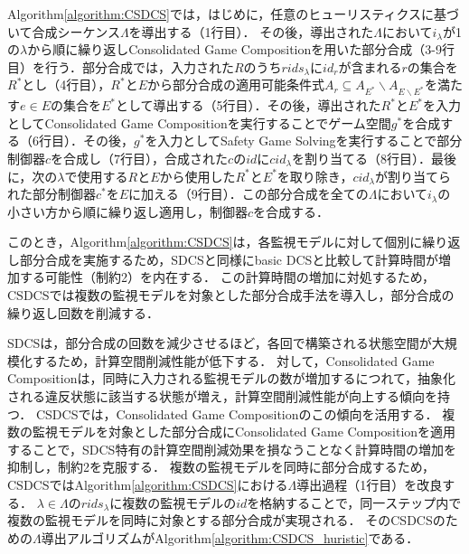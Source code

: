 Algorithm\ref{algorithm:CSDCS}では，はじめに，任意のヒューリスティクスに基づいて合成シーケンス$\Lambda$を導出する（1行目）．
その後，導出された$\Lambda$において$i_{\lambda}$が1の$\lambda$から順に繰り返しConsolidated Game Compositionを用いた部分合成（3-9行目）を行う．部分合成では，入力された$R$のうち$rids_{\lambda}$に$id_{r}$が含まれる$r$の集合を$R^*$とし（4行目），$R^*$と$E$から部分合成の適用可能条件式$A_{r} \subseteq A_{E^*} \backslash A_{E \backslash E^*}$を満たす$e \in E$の集合を$E^*$として導出する（5行目）．その後，導出された$R^*$と$E^*$を入力としてConsolidated Game Compositionを実行することでゲーム空間$g^*$を合成する（6行目）．その後，$g^*$を入力としてSafety Game Solvingを実行することで部分制御器$c$を合成し（7行目），合成された$c$の$id$に$cid_{\lambda}$を割り当てる（8行目）．最後に，次の$\lambda$で使用する$R$と$E$から使用した$R^*$と$E^*$を取り除き，$cid_{\lambda}$が割り当てられた部分制御器$c^*$を$E$に加える（9行目）．この部分合成を全ての$\Lambda$において$i_{\lambda}$の小さい方から順に繰り返し適用し，制御器$c$を合成する．

このとき，Algorithm\ref{algorithm:CSDCS}は，各監視モデルに対して個別に繰り返し部分合成を実施するため，SDCSと同様にbasic DCSと比較して計算時間が増加する可能性（制約2）を内在する．
この計算時間の増加に対処するため，CSDCSでは複数の監視モデルを対象とした部分合成手法を導入し，部分合成の繰り返し回数を削減する．

SDCSは，部分合成の回数を減少させるほど，各回で構築される状態空間が大規模化するため，計算空間削減性能が低下する．
対して，Consolidated Game Compositionは，同時に入力される監視モデルの数が増加するにつれて，抽象化される違反状態に該当する状態が増え，計算空間削減性能が向上する傾向を持つ．
CSDCSでは，Consolidated Game Compositionのこの傾向を活用する．
複数の監視モデルを対象とした部分合成にConsolidated Game Compositionを適用することで，SDCS特有の計算空間削減効果を損なうことなく計算時間の増加を抑制し，制約2を克服する．
複数の監視モデルを同時に部分合成するため，CSDCSではAlgorithm\ref{algorithm:CSDCS}における$\Lambda$導出過程（1行目）を改良する．
$\lambda \in \Lambda$の$rids_{\lambda}$に複数の監視モデルの$id$を格納することで，同一ステップ内で複数の監視モデルを同時に対象とする部分合成が実現される．
そのCSDCSのための$\Lambda$導出アルゴリズムがAlgorithm\ref{algorithm:CSDCS_huristic}である．


